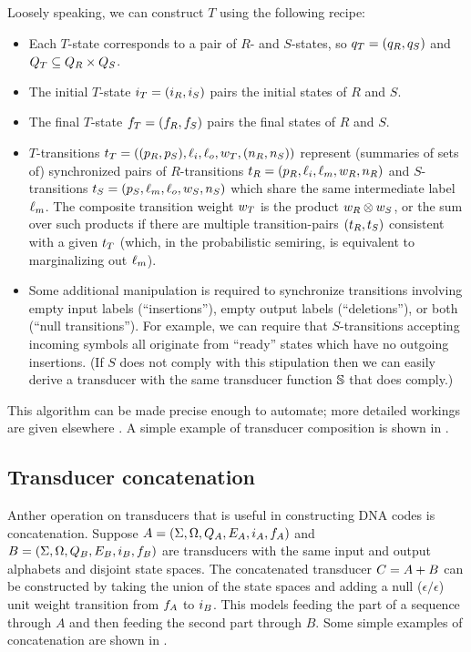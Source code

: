 \documentclass[english]{article}
\begin{document}
Loosely speaking, we can construct $T$ using the following recipe:
\begin{itemize}
\item Each $T$-state corresponds to a pair of $R$- and $S$-states,
so $q_T = (q_R, q_S)$
and $Q_T \subseteq Q_R \times Q_S$.
\item The initial $T$-state $i_T=(i_R,i_S)$ pairs the initial states of $R$ and $S$.
\item The final $T$-state $f_T=(f_R,f_S)$ pairs the final states of $R$ and $S$.
\item $T$-transitions
$t_T = ((p_R,p_S),\ell_i,\ell_o,w_T,(n_R,n_S))$
represent (summaries of sets of) synchronized pairs of $R$-transitions
$t_R = (p_R,\ell_i,\ell_m,w_R,n_R)$
and $S$-transitions
$t_S = (p_S,\ell_m,\ell_o,w_S,n_S)$
which share the same intermediate label $\ell_m$.
The composite transition weight $w_T$ is the product $w_R \otimes w_S$,
or the sum over such products if there are multiple transition-pairs $(t_R,t_S)$
consistent with a given $t_T$
(which, in the probabilistic semiring, is equivalent to marginalizing out $\ell_m$).
\item Some additional manipulation is required to synchronize
transitions involving empty input labels (``insertions''),
empty output labels (``deletions''),
or both (``null transitions'').
For example, we can require that $S$-transitions accepting incoming symbols
all originate from ``ready'' states which have no outgoing insertions.
(If $S$ does not comply with this stipulation then we can easily derive a transducer
with the same transducer function $\mathbb{S}$ that does comply.)
\end{itemize}

This algorithm can be made precise enough to automate;
more detailed workings are given elsewhere \cite{PereiraRiley1996,MohriPereiraRiley2000,Holmes2003,Holmes2007,WestessonEtAlArxiv2012,WestessonEtAl2012}.
A simple example of transducer composition is shown in .

\subsection{Transducer concatenation}

Anther operation on transducers that is useful in constructing DNA codes
is concatenation.
Suppose
 $A = (\Sigma, \Omega, Q_A, E_A, i_A, f_A)$ and
 $B = (\Sigma, \Omega, Q_B, E_B, i_B, f_B)$
are transducers with the same input and output alphabets and disjoint state spaces.
The concatenated transducer $C = A + B$ can be constructed by
taking the union of the state spaces and adding a null ($\epsilon/\epsilon$) unit weight transition
from $f_A$ to $i_B$.
This models feeding the part of a sequence through $A$ and then feeding the second part through $B$.
Some simple examples of concatenation are shown in .
\end{document}
